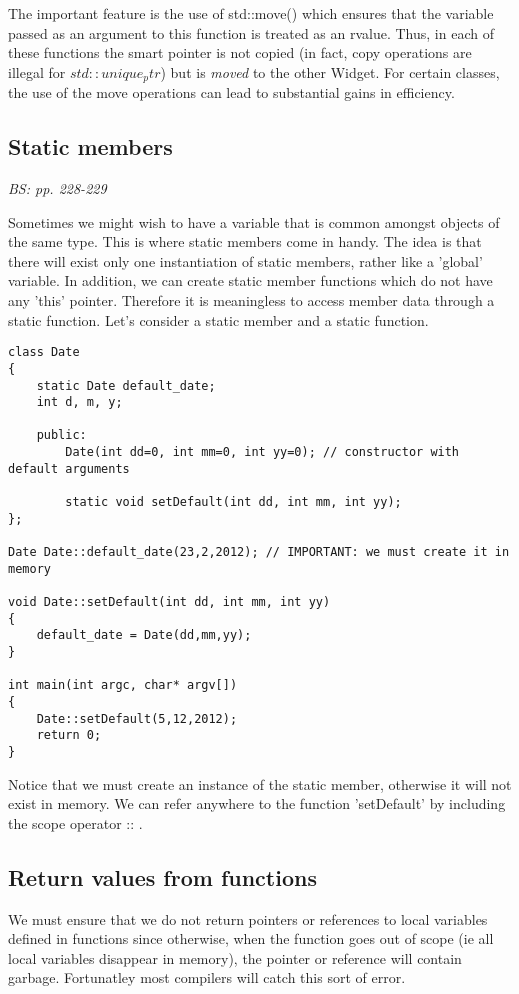 The important feature is the use of std::move() which ensures that the variable passed as an argument to this function is treated as an rvalue. Thus, in each of these functions the smart pointer is not copied (in fact, copy operations are illegal for $std::unique_ptr$) but is \textit{moved} to the other Widget. For certain classes, the use of the move operations can lead to substantial gains in efficiency. 

\subsection{Static members}

\emph{BS: pp. 228-229}

Sometimes we might wish to have a variable that is common amongst objects of the same type. This is where static members come in handy. The idea is that there will exist only one instantiation of static members, rather like a 'global' variable. In addition, we can create static member functions which do not have any 'this' pointer. Therefore it is meaningless to access member data through a static function. Let's consider a static member and a static function.
\begin{lstlisting}[label=static,caption=Static members]
class Date
{
	static Date default_date;
	int d, m, y;
	
	public:
		Date(int dd=0, int mm=0, int yy=0);	// constructor with default arguments
		
		static void setDefault(int dd, int mm, int yy);
};

Date Date::default_date(23,2,2012);	// IMPORTANT: we must create it in memory

void Date::setDefault(int dd, int mm, int yy)
{
	default_date = Date(dd,mm,yy);
}

int main(int argc, char* argv[])
{
	Date::setDefault(5,12,2012);
	return 0;
}
\end{lstlisting}
Notice that we must create an instance of the static member, otherwise it will not exist in memory. We can refer anywhere to the function 'setDefault' by including the scope operator :: . 

\subsection{Return values from functions}

We must ensure that we do not return pointers or references to local variables defined in functions since otherwise, when the function goes out of scope (ie all local variables disappear in memory), the pointer or reference will contain garbage. Fortunatley most compilers will catch this sort of error.

